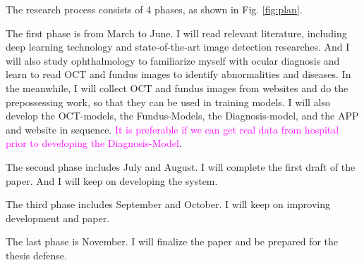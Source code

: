\documentclass{article}
\begin{document}
		The research process consists of 4 phases, as shown in Fig. \ref{fig:plan}.
		
		The first phase is from March to June. I will read relevant literature, including deep learning technology and state-of-the-art image detection researches. And I will also study ophthalmology to familiarize myself with ocular diagnosis and learn to read OCT and fundus images to identify abnormalities and diseases. In the meanwhile, I will collect OCT and fundus images from websites and do the prepossessing work, so that they can be used in training models. I will also develop the OCT-models, the Fundus-Models, the Diagnosis-model, and the APP and website in sequence.  \textcolor{magenta}{It is preferable if we can get real data from hospital prior to developing the Diagnosis-Model}.
		
		The second phase includes July and August. I will complete the first draft of the paper. And I will keep on developing the system. 
		
		The third phase includes September and October. I will keep on improving development and paper.
		
		The last phase is November. I will finalize the paper and be prepared for the thesis defense.

	\newrefcontext[sorting=nyt]
	\printbibliography
	
\end{document}
